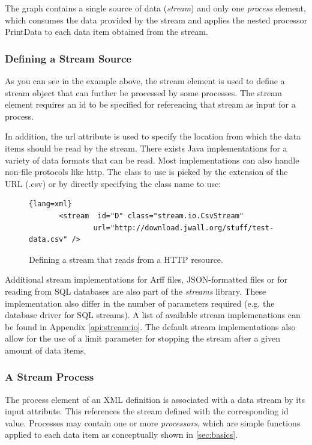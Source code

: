 The graph contains a single source of data ({\em stream}) and only
one {\em process} element, which consumes the data provided by the
stream and applies the nested processor {\ttfamily PrintData} to
each data item obtained from the stream.

\subsubsection{Defining a Stream Source}
As you can see in the example above, the {\ttfamily stream} element is used to define
a stream object that can further be processed by some processes. The {\ttfamily stream}
element requires an {\ttfamily id} to be specified for referencing that stream as input
for a process. 

In addition, the {\ttfamily url} attribute is used to specify the location
from which the data items should be read by the stream. There exists Java implementations
for a variety of data formats that can be read. Most implementations can also handle 
non-file protocols like {\ttfamily http}. The class to use is picked by the extension
of the URL ({\ttfamily .csv}) or by directly specifying the class name to use:
\begin{figure}[h!]{\footnotesize
    \centering
    \begin{lstlisting}{lang=xml}
       <stream  id="D" class="stream.io.CsvStream"
               url="http://download.jwall.org/stuff/test-data.csv" />
    \end{lstlisting}
    \caption{\label{fig:defStream}Defining a stream that reads from a HTTP resource.}
}
\end{figure}

Additional stream implementations for Arff files, JSON-formatted files or for reading 
from SQL databases are also part of the {\em streams} library. These implementation
also differ in the number of parameters required (e.g. the database driver for SQL
streams). A list of available stream implemenations can be found in Appendix \ref{api:stream:io}.
The default stream implementations also allow for the use of a {\ttfamily limit} parameter
for stopping the stream after a given amount of data items.

\subsubsection{A Stream Process}
The {\ttfamily process} element of an XML definition is associated
with a data stream by its {\ttfamily input} attribute. This references
the stream defined with the corresponding {\ttfamily id}
value. Processes may contain one or more {\em processors}, which are
simple functions applied to each data item as conceptually shown in
\ref{sec:basics}.

